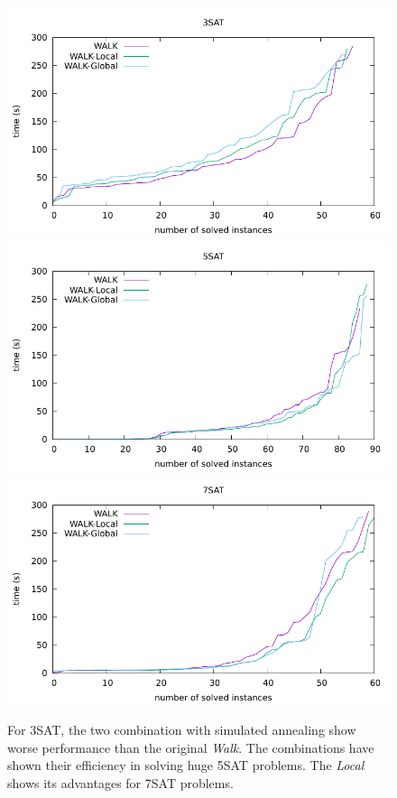 \documentclass[12pt,a4paper,twoside]{scrartcl}
\numberwithin{equation}{section}
\begin{document}
\begin{figure}[H]
\begin{center}
  \includegraphics[scale = 0.8]{DATA/K3/e3w.pdf}
  \includegraphics[scale = 0.8]{DATA/K5/e3w.pdf} 
  \includegraphics[scale = 0.8]{DATA/K7/e3w.pdf} 
  \caption{For 3SAT, the two combination with simulated annealing show worse performance than the original \emph{Walk}. The combinations  have shown their  efficiency in solving huge 5SAT problems. The \emph{Local} shows its advantages for 7SAT problems.
}
  \end{center}
  \label{Experiment 3 Walk cactus plot}
  \end{figure}
\end{document}
